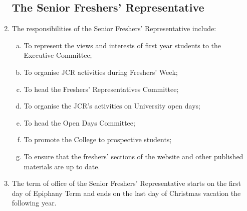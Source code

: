 \documentclass[12pt]{article}
\begin{document}
\begin{enumerate}
    \subsection{The Senior Freshers’ Representative}
    \item The responsibilities of the Senior Freshers' Representative include:
    \begin{enumerate}[(a)]
        \item To represent the views and interests of first year students to the Executive Committee;
        \item To organise JCR activities during Freshers’ Week;
        \item To head the Freshers’ Representatives Committee;
        \item To organise the JCR’s activities on University open days;
        \item To head the Open Days Committee;
        \item To promote the College to prospective students;
        \item To ensure that the freshers’ sections of the website and other published materials are up to date.
    \end{enumerate}
    \item The term of office of the Senior Freshers' Representative starts on the first day of Epiphany Term and ends on the last day of Christmas vacation the following year.

\end{enumerate}
\end{document}
